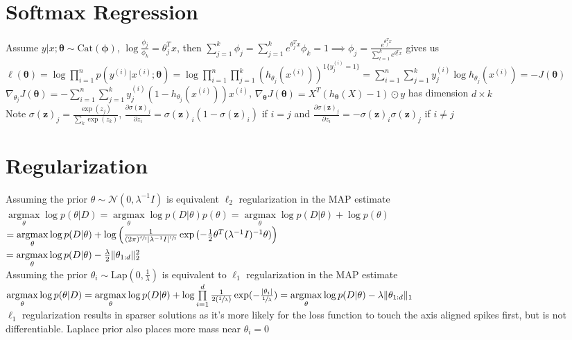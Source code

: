 \documentclass{article}
\newcommand{\N}{\mathcal{N}}
\DeclareMathOperator*{\argmax}{argmax}
\DeclarePairedDelimiter\abs{\lvert}{\rvert}
\DeclarePairedDelimiter\norm{\lVert}{\rVert}
\begin{document}
\section{Softmax Regression}
Assume $y|x ; \boldsymbol \theta \sim \mbox{Cat}(\boldsymbol \phi)$, $\log\frac{\phi_j}{\phi_k} = \theta_j^Tx$, then $\sum\limits_{j=1}^k \phi_j = \sum\limits_{j=1}^k e^{\theta_j^Tx}\phi_k = 1 \implies \phi_j = \frac{e^{\theta_j^Tx}}{\sum_{l=1}^k e^{\theta_l^Tx}}$ gives us \\
$\ell(\boldsymbol \theta) = \log \prod\limits_{i=1}^n p(y^{(i)} | x^{(i)} ; \boldsymbol \theta) = \log \prod\limits_{i=1}^n \prod\limits_{j=1}^k (h_{\theta_j}(x^{(i)}) )^{1\{y^{(i)}_j = 1\}} = \sum\limits_{i=1}^n \sum\limits_{j=1}^k y_j^{(i)}\log h_{\theta_j}(x^{(i)}) = - J(\boldsymbol \theta)$ \\
$\nabla_{\theta_j} J(\boldsymbol \theta) = -\sum\limits_{i=1}^n \sum\limits_{j=1}^k y_j^{(i)}(1-h_{\theta_j}(x^{(i)}))x^{(i)}$, $\nabla_{\boldsymbol \theta}J(\boldsymbol \theta) = X^T (h_{\boldsymbol \theta}(X)-1)\odot y$ has dimension $d \times k$ \\
Note $\sigma(\boldsymbol z)_j = \frac{\exp(z_j)}{\sum_k \exp(z_k)}$, $\frac{\partial \sigma (\boldsymbol z)_j}{\partial z_i} = \sigma (\boldsymbol z)_i ( 1- \sigma (\boldsymbol z)_i)$ if $i = j$ and $\frac{\partial \sigma (\boldsymbol z)_j}{\partial z_i} = -\sigma (\boldsymbol z)_i\sigma (\boldsymbol z)_j$ if $i \neq j$

\section{Regularization}
Assuming the prior $\theta \sim \N(0, \lambda^{-1}I)$ is equivalent $\ell_2$ regularization in the MAP estimate \\
$\argmax\limits_\theta \log p(\theta | D) = \argmax\limits_\theta \log p(D | \theta) p(\theta) = \argmax\limits_\theta \log p(D| \theta) + \log p(\theta)$ \\
\hspace*{2.717cm} $ = \argmax\limits_\theta \log p(D| \theta) + \log \Big(\frac{1}{(2\pi)^{\sfrac{d}{2}} \abs{\lambda^{-1}I}^{\sfrac{1}{2}}}\exp{(-\frac{1}{2} \theta^T (\lambda^{-1}I)^{-1} \theta)}\Big) $ \\
\hspace*{2.717cm} $ =\argmax\limits_\theta  \log p(D| \theta) - \frac{\lambda}{2}\norm {\theta_{1:d}}_2^2$ \\
Assuming the prior $\theta_i \sim \mbox{Lap}(0, \frac{1}{\lambda})$ is equivalent to $\ell_1$ regularization in the MAP estimate \\
$\argmax\limits_\theta \log p(\theta | D) = \argmax\limits_\theta \log p(D| \theta) + \log \prod\limits_{i=1}^d \frac{1}{2 (\sfrac{1}{\lambda})}\exp (-\frac{\abs{ \theta_i}}{\sfrac{1}{\lambda}}) =  \argmax\limits_\theta \log p(D| \theta) -\lambda \norm{\theta_{1:d}}_1$ \\
$\ell_1$ regularization results in sparser solutions as it's more likely for the loss function to touch the axis aligned spikes first, but is not differentiable. Laplace prior also places more mass near $\theta_i = 0$ 
\end{document}
